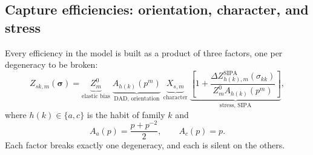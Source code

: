 \documentclass{article}
\begin{document}
\subsection{Capture efficiencies: orientation, character, and stress}
\label{sec:character}

Every efficiency in the model is built as a product of three factors, one per
degeneracy to be broken:
\begin{equation}
  Z_{sk,m}(\bm\sigma)
  =\underbrace{Z^0_m}_{\text{elastic bias}}\;
   \underbrace{A_{h(k)}(p^m)}_{\text{DAD, orientation}}\;
   \underbrace{X_{s,m}}_{\text{character}}\;
   \underbrace{\left[1+\frac{\Delta Z^{\mathrm{SIPA}}_{h(k),m}(\sigma_{kk})}
                          {Z^0_m A_{h(k)}(p^m)}\right]}_{\text{stress, SIPA}},
  \label{eq:Zsk}
\end{equation}
where $h(k)\in\{a,c\}$ is the habit of family $k$ and
\begin{equation}
  A_a(p)=\frac{p+p^{-2}}{2},\qquad A_c(p)=p .
  \label{eq:Afactors}
\end{equation}
Each factor breaks exactly one degeneracy, and each is silent on the others.
\end{document}
